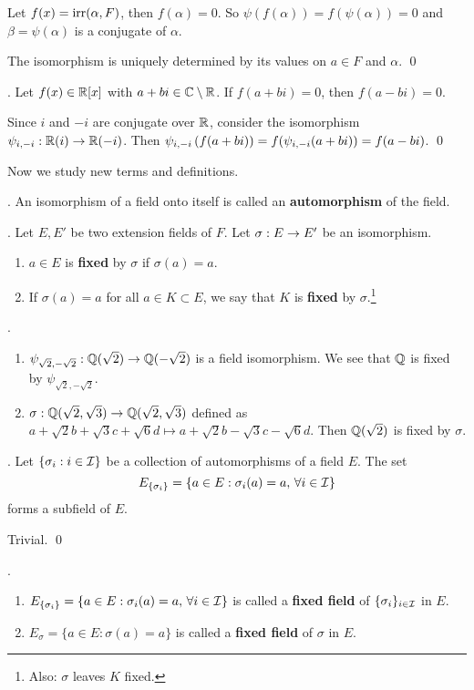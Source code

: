 \pf {} Let \(f(x) = \mathrm{irr}(\alpha, F)\), then \(f(\alpha) = 0\). So \(\psi(f(\alpha)) = f(\psi(\alpha)) = 0\) and \(\beta = \psi(\alpha)\) is a conjugate of \(\alpha\).

 The isomorphism is uniquely determined by its values on \(a \in F\) and \(\alpha\). \qed

\cor. Let \(f(x) \in \mathbb{R}[x]\) with \(a + bi \in \mathbb{C} \setminus \mathbb{R}\). If \(f(a + bi) = 0\), then \(f(a - bi) = 0\).

\pf Since \(i\) and \(-i\) are conjugate over \(\mathbb{R}\), consider the isomorphism \(\psi_{i, -i} : \mathbb{R}(i) \rightarrow \mathbb{R}(-i)\). Then \(\psi_{i, -i}\left( f(a+bi) \right) = f(\psi_{i, -i}(a + bi)) = f(a-bi)\). \qed

Now we study new terms and definitions.

.  An isomorphism of a field onto itself is called an \textbf{automorphism} of the field.

. Let \(E, E'\) be two extension fields of \(F\). Let \(\sigma : E \rightarrow E'\) be an isomorphism.
\begin{enumerate}
    \item \(a \in E\) is \textbf{fixed} by \(\sigma\) if \(\sigma(a) = a\).

    \item If \(\sigma(a) = a\) for all \(a \in K \subset E\), we say that \(K\) is \textbf{fixed} by \(\sigma\).\footnote{Also: \(\sigma\) leaves \(K\) fixed.}
\end{enumerate}

\ex.
\begin{enumerate}
    \item \(\psi_{\sqrt{2}, -\sqrt{2}} : \mathbb{Q}(\sqrt{2}) \rightarrow \mathbb{Q}(-\sqrt{2})\) is a field isomorphism. We see that \(\mathbb{Q}\) is fixed by \(\psi_{\sqrt{2}, -\sqrt{2}}\).
    \item \(\sigma : \mathbb{Q}(\sqrt{2}, \sqrt{3}) \rightarrow \mathbb{Q}(\sqrt{2}, \sqrt{3})\) defined as \(a + \sqrt{2}b + \sqrt{3}c + \sqrt{6}d \mapsto a + \sqrt{2}b - \sqrt{3}c - \sqrt{6}d\). Then \(\mathbb{Q}(\sqrt{2})\) is fixed by \(\sigma\).
\end{enumerate}

\thm. Let \(\{\sigma_i : i \in \mathcal{I}\}\) be a collection of automorphisms of a field \(E\). The set
\[
    E_{\{\sigma_i\}} = \{a \in E : \sigma_i(a) = a,\, \forall i \in \mathcal{I}\}
\]
forms a subfield of \(E\).

\pf Trivial. \qed

. 
\begin{enumerate}
    \item \(E_{\{\sigma_i\}} = \{a \in E : \sigma_i(a) = a,\, \forall i \in \mathcal{I}\}\) is called a \textbf{fixed field} of \(\{\sigma_i\}_{i \in \mathcal{I}}\) in \(E\).
    \item \(E_\sigma = \{a \in E : \sigma(a) = a\}\) is called a \textbf{fixed field} of \(\sigma\) in \(E\).
\end{enumerate}

